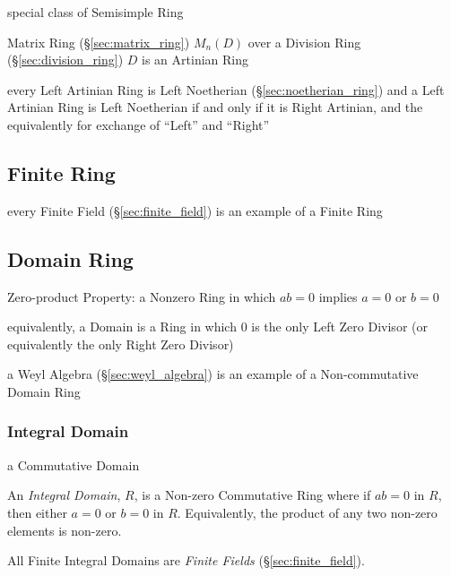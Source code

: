 \begin{itemize}
special class of Semisimple Ring

Matrix Ring (\S\ref{sec:matrix_ring}) $M_n(D)$ over a Division Ring
(\S\ref{sec:division_ring}) $D$ is an Artinian Ring

every Left Artinian Ring is Left Noetherian (\S\ref{sec:noetherian_ring}) and a
Left Artinian Ring is Left Noetherian if and only if it is Right Artinian, and
the equivalently for exchange of ``Left'' and ``Right''



\subsection{Finite Ring}\label{sec:finite_ring}

every Finite Field (\S\ref{sec:finite_field}) is an example of a Finite Ring



\subsection{Domain Ring}\label{sec:domain_ring}

Zero-product Property: a Nonzero Ring in which $ab = 0$ implies $a = 0$ or $b =
0$

equivalently, a Domain is a Ring in which $0$ is the only Left Zero Divisor (or
equivalently the only Right Zero Divisor)

a Weyl Algebra (\S\ref{sec:weyl_algebra}) is an example of a Non-commutative
Domain Ring



\subsubsection{Integral Domain}\label{sec:integral_domain}

a Commutative Domain

An \emph{Integral Domain}, $R$, is a Non-zero Commutative Ring where
if $ab = 0$ in $R$, then either $a = 0$ or $b = 0$ in $R$.
Equivalently, the product of any two non-zero elements is non-zero.

All Finite Integral Domains are \emph{Finite Fields}
(\S\ref{sec:finite_field}).


\end{itemize}
